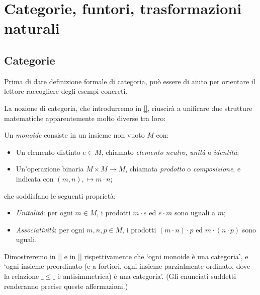 \chapter{Categorie, funtori, trasformazioni naturali}

\section{Categorie}\label{categorie}

Prima di dare definizione formale di categoria, può essere di aiuto per orientare il lettore raccogliere degli esempi concreti.

La nozione di categoria, che introdurremo in \autoref{}, riuscirà a unificare due strutture matematiche apparentemente molto diverse tra loro:
\begin{definition}
    Un \emph{monoide} consiste in un insieme non vuoto $M$ con:
    \begin{itemize}
     \item Un elemento distinto $e\in M$, chiamato \emph{elemento neutro}, \emph{unità} o \emph{identità};
     \item Un'operazione binaria $M\times M\to M$, chiamata \emph{prodotto} o \emph{composizione}, e indicata con $(m,n),\mapsto m\cdot n$;
    \end{itemize}
    che soddisfano le seguenti proprietà:
    \begin{itemize}
     \item \emph{Unitalità}: per ogni $m\in M$, i prodotti $m \cdot e$ ed $e\cdot m$ sono uguali a $m$;
     \item \emph{Associatività}: per ogni $m,n,p\in M$, i prodotti $(m\cdot n)\cdot p$ ed $m\cdot (n\cdot p)$ sono uguali.
    \end{itemize}
   \end{definition}
\begin{definition}
\end{definition}
Dimostreremo in \autoref{} e in \autoref{} rispettivamente che `ogni monoide è una categoria', e `ogni insieme preordinato (e a fortiori, ogni insieme parzialmente ordinato, dove la relazione $\_\le\_$ è antisimmetrica) è una categoria'. (Gli enunciati suddetti renderanno precise queste affermazioni.)
